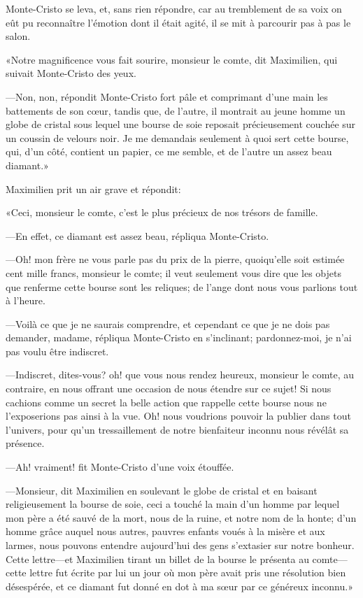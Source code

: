 Monte-Cristo se leva, et, sans rien répondre, car au tremblement de sa voix on eût pu reconnaître l'émotion dont il était agité, il se mit à parcourir pas à pas le salon. 

«Notre magnificence vous fait sourire, monsieur le comte, dit Maximilien, qui suivait Monte-Cristo des yeux. 

—Non, non, répondit Monte-Cristo fort pâle et comprimant d'une main les battements de son cœur, tandis que, de l'autre, il montrait au jeune homme un globe de cristal sous lequel une bourse de soie reposait précieusement couchée sur un coussin de velours noir. Je me demandais seulement à quoi sert cette bourse, qui, d'un côté, contient un papier, ce me semble, et de l'autre un assez beau diamant.» 

Maximilien prit un air grave et répondit: 

«Ceci, monsieur le comte, c'est le plus précieux de nos trésors de famille. 

—En effet, ce diamant est assez beau, répliqua Monte-Cristo.  

—Oh! mon frère ne vous parle pas du prix de la pierre, quoiqu'elle soit estimée cent mille francs, monsieur le comte; il veut seulement vous dire que les objets que renferme cette bourse sont les reliques; de l'ange dont nous vous parlions tout à l'heure. 

—Voilà ce que je ne saurais comprendre, et cependant ce que je ne dois pas demander, madame, répliqua Monte-Cristo en s'inclinant; pardonnez-moi, je n'ai pas voulu être indiscret. 

—Indiscret, dites-vous? oh! que vous nous rendez heureux, monsieur le comte, au contraire, en nous offrant une occasion de nous étendre sur ce sujet! Si nous cachions comme un secret la belle action que rappelle cette bourse nous ne l'exposerions pas ainsi à la vue. Oh! nous voudrions pouvoir la publier dans tout l'univers, pour qu'un tressaillement de notre bienfaiteur inconnu nous révélât sa présence. 

—Ah! vraiment! fit Monte-Cristo d'une voix étouffée. 

—Monsieur, dit Maximilien en soulevant le globe de cristal et en baisant religieusement la bourse de soie, ceci a touché la main d'un homme par lequel mon père a été sauvé de la mort, nous de la ruine, et notre nom de la honte; d'un homme grâce auquel nous autres, pauvres enfants voués à la misère et aux larmes, nous pouvons entendre aujourd'hui des gens s'extasier sur notre bonheur. Cette lettre—et Maximilien tirant un billet de la bourse le présenta au comte—cette lettre fut écrite par lui un jour où mon père avait pris une résolution bien désespérée, et ce diamant fut donné en dot à ma sœur par ce généreux inconnu.» 

